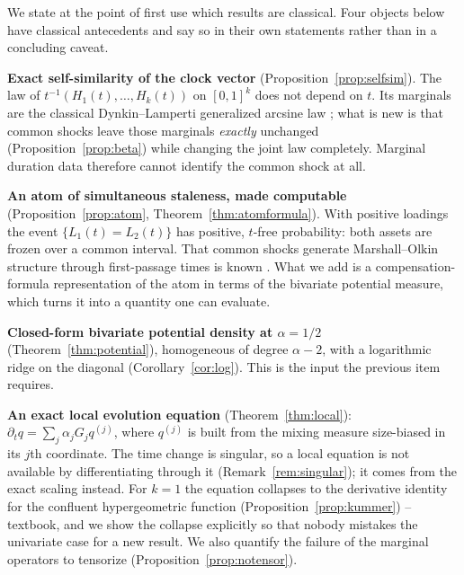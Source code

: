 \documentclass{ws-ijtaf}
\begin{document}
We state at the point of first use which results are classical. Four objects
below have classical antecedents and say so in their own statements rather than
in a concluding caveat.

\begin{arabiclist}
\item \textbf{Exact self-similarity of the clock vector}
(Proposition~\ref{prop:selfsim}). The law of $t^{-1}(H_1(t),\dots,H_k(t))$ on
$[0,1]^k$ does not depend on $t$. Its marginals are the classical
Dynkin--Lamperti generalized arcsine law \citep{lam58,dyn61,ber99}; what is new
is that common shocks leave those marginals \emph{exactly} unchanged
(Proposition~\ref{prop:beta}) while changing the joint law completely. Marginal
duration data therefore cannot identify the common shock at all.

\item \textbf{An atom of simultaneous staleness, made computable}
(Proposition~\ref{prop:atom}, Theorem~\ref{thm:atomformula}). With positive
loadings the event $\{L_1(t)=L_2(t)\}$ has positive, $t$-free probability: both
assets are frozen over a common interval. That common shocks generate
Marshall--Olkin structure through first-passage times is known \citep{mar67,sun17}.
What we add is a compensation-formula representation of the atom in terms of the
bivariate potential measure, which turns it into a quantity one can evaluate.

\item \textbf{Closed-form bivariate potential density at $\alpha=1/2$}
(Theorem~\ref{thm:potential}), homogeneous of degree $\alpha-2$, with a
logarithmic ridge on the diagonal (Corollary~\ref{cor:log}). This is the input
the previous item requires.

\item \textbf{An exact local evolution equation} (Theorem~\ref{thm:local}):
$\partial_t q = \sum_j \alpha_j G_j q^{(j)}$, where $q^{(j)}$ is built from the
mixing measure size-biased in its $j$th coordinate. The time change is singular,
so a local equation is not available by differentiating through it
(Remark~\ref{rem:singular}); it comes from the exact scaling instead. For $k=1$
the equation collapses to the derivative identity for the confluent
hypergeometric function (Proposition~\ref{prop:kummer}) -- textbook, and we show
the collapse explicitly so that nobody mistakes the univariate case for a new
result. We also quantify the failure of the marginal operators to tensorize
(Proposition~\ref{prop:notensor}).


\end{arabiclist}
\end{document}
